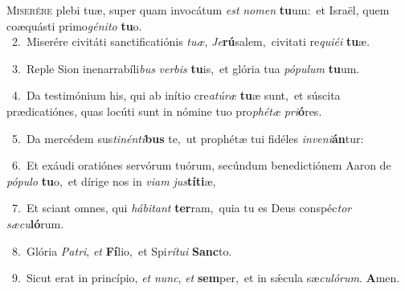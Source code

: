 \lettrine{\initial\textcolor{\initialcolor}{M}}{iserére} plebi tuæ, super quam invocátum \textit{est} \textit{no}\-\textit{men} \textbf{tu}\-um:~\star et Israël, quem coæquásti primo\-\textit{gé}\-\textit{ni}\textit{to} \textbf{tu}\-o.\\
{\numbfont\textcolor{\numbcolor}{~2.}}~Miserére civitáti sanctificatiónis \textit{tu}\-\textit{æ}, \textit{Je}\-\textbf{rú}salem,~\star civitati re\-\textit{qui}\-\textit{é}\textit{i} \textbf{tu}\-æ.\par
{\numbfont\textcolor{\numbcolor}{~3.}}~Reple Sion inenarrabíli\textit{bus} \textit{ver}\-\textit{bis} \textbf{tu}\-is,~\star et glória tua \textit{pó}\-\textit{pu}\textit{lum} \textbf{tu}\-um.\par
{\numbfont\textcolor{\numbcolor}{~4.}}~Da testimónium his, qui ab inítio cre\-\textit{a}\-\textit{tú}\textit{ræ} \textbf{tu}\-æ sunt,~\star et súscita prædicatiónes, quas locúti sunt in nómine tuo pro\-\textit{phé}\-\textit{tæ} \textit{pri}\-\textbf{ó}res.\par
{\numbfont\textcolor{\numbcolor}{~5.}}~Da mercédem sus\-\textit{ti}\-\textit{nén}\textit{ti}\textbf{bus} te,~\star ut prophétæ tui fidéles \textit{in}\-\textit{ve}\textit{ni}\textbf{án}tur:\par
{\numbfont\textcolor{\numbcolor}{~6.}}~Et exáudi oratiónes servórum tuórum, secúndum benedictiónem Aaron de \textit{pó}\-\textit{pu}\textit{lo} \textbf{tu}\-o,~\star et dírige nos in \textit{vi}\-\textit{am} \textit{jus}\-\textbf{tí}\textbf{ti}æ,\par
{\numbfont\textcolor{\numbcolor}{~7.}}~Et sciant omnes, qui \textit{há}\-\textit{bi}\textit{tant} \textbf{ter}\-ram,~\star quia tu es Deus conspéc\textit{tor} \textit{sæ}\-\textit{cu}\textbf{ló}rum.\par
{\numbfont\textcolor{\numbcolor}{~8.}}~Glória \textit{Pa}\-\textit{tri}, \textit{et} \textbf{Fí}\-lio,~\star et Spi\-\textit{rí}\-\textit{tu}\textit{i} \textbf{Sanc}\-to.\par
{\numbfont\textcolor{\numbcolor}{~9.}}~Sicut erat in princípio, \textit{et} \textit{nunc}\-, \textit{et} \textbf{sem}\-per,~\star et in sǽcula sæ\-\textit{cu}\-\textit{ló}\textit{rum}. \textbf{A}\-men.\par
